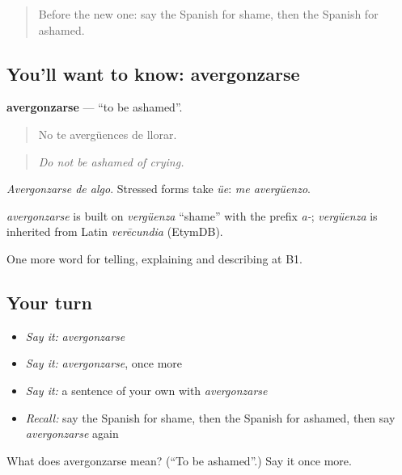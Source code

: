 \label{lesson:ES-C705-avergonzarse}



\begin{quote}
Before the new one: say the Spanish for shame, then the Spanish for ashamed.
\end{quote}

\subsection*{You'll want to know: avergonzarse}
\textbf{avergonzarse} — \textquotedblleft{}to be ashamed\textquotedblright{}.

\begin{quote}
No te avergüences de llorar.
\end{quote}

\begin{quote}
\emph{Do not be ashamed of crying.}
\end{quote}

\emph{Avergonzarse de algo}. Stressed forms take \emph{üe}: \emph{me avergüenzo}.

\begin{cousinweb}
\emph{avergonzarse} is built on \emph{vergüenza} \textquotedblleft{}shame\textquotedblright{} with the prefix \emph{a-}; \emph{vergüenza} is inherited from Latin \emph{verēcundia} (EtymDB).
\end{cousinweb}

\begin{grammarlens}[title={What you've built}]
One more word for telling, explaining and describing at B1.
\end{grammarlens}

\subsection*{Your turn}
\begin{itemize}
\raggedright
  \item \emph{Say it:} \emph{avergonzarse}
  \item \emph{Say it:} \emph{avergonzarse}, once more
  \item \emph{Say it:} a sentence of your own with \emph{avergonzarse}
  \item \emph{Recall:} say the Spanish for shame, then the Spanish for ashamed, then say \emph{avergonzarse} again
\end{itemize}

\begin{tcolorbox}[breakable,colback=teal!4,colframe=teal!35!black,title={Before you move on}]
What does avergonzarse mean? (\textquotedblleft{}To be ashamed\textquotedblright{}.) Say it once more.
\end{tcolorbox}
